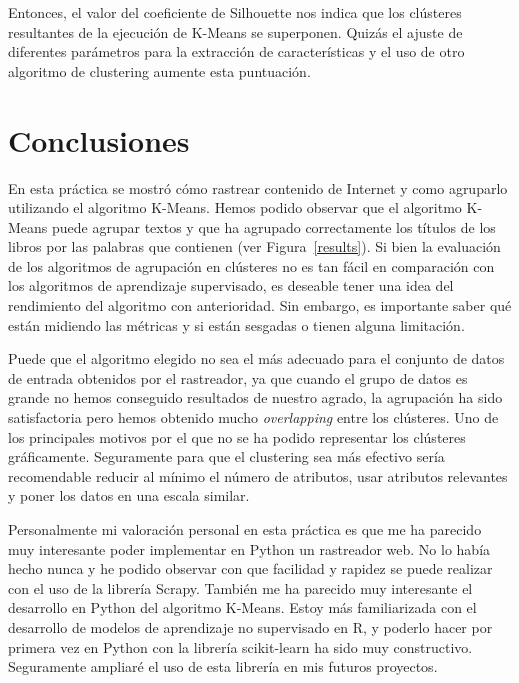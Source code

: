 \documentclass{uimppracticas}
\begin{document}
Entonces, el valor del coeficiente de Silhouette nos indica que los clústeres resultantes de la ejecución de K-Means se superponen. Quizás el ajuste de diferentes parámetros para la extracción de características y el uso de otro algoritmo de clustering aumente esta puntuación.

\section{Conclusiones}

En esta práctica se mostró cómo rastrear contenido de Internet y como agruparlo utilizando el algoritmo K-Means. Hemos podido observar que el algoritmo K-Means puede agrupar textos y que ha agrupado correctamente los títulos de los libros por las palabras que contienen (ver Figura~\ref{results}). Si bien la evaluación de los algoritmos de agrupación en clústeres no es tan fácil en comparación con los algoritmos de aprendizaje supervisado, es deseable tener una idea del rendimiento del algoritmo con anterioridad. Sin embargo, es importante saber qué están midiendo las métricas y si están sesgadas o tienen alguna limitación. 

Puede que el algoritmo elegido no sea el más adecuado para el conjunto de datos de entrada obtenidos por el rastreador, ya que cuando el grupo de datos es grande no hemos conseguido resultados de nuestro agrado, la agrupación ha sido satisfactoria pero hemos obtenido mucho \textit{overlapping} entre los clústeres. Uno de los principales motivos por el que no se ha podido representar los clústeres gráficamente. Seguramente para que el clustering sea más efectivo sería recomendable reducir al mínimo el número de atributos, usar atributos relevantes y poner los datos en una escala similar.

Personalmente mi valoración personal en esta práctica es que me ha parecido muy interesante poder implementar en Python un rastreador web. No lo había hecho nunca y he podido observar con que facilidad y rapidez se puede realizar con el uso de la librería Scrapy. También me ha parecido muy interesante el desarrollo en Python del algoritmo K-Means. Estoy más familiarizada con el desarrollo de modelos de aprendizaje no supervisado en R, y poderlo hacer por primera vez en Python con la librería scikit-learn ha sido muy constructivo. Seguramente ampliaré el uso de esta librería en mis futuros proyectos.

\renewcommand{\refname}{Bibliografía}


\end{document}
